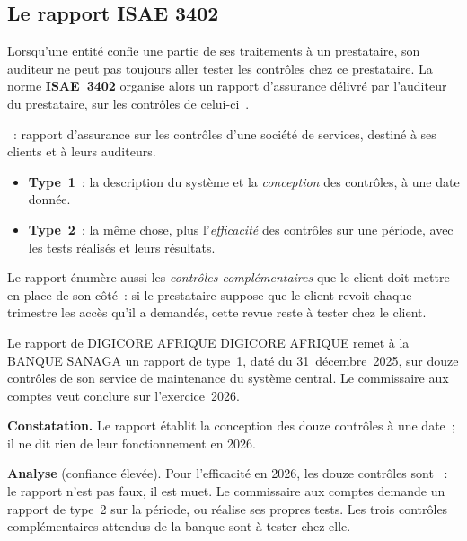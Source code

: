 \subsection{Le rapport ISAE 3402}

Lorsqu'une entité confie une partie de ses traitements à un prestataire,
son auditeur ne peut pas toujours aller tester les contrôles chez ce
prestataire. La norme \textbf{ISAE~3402} organise alors un rapport
d'assurance délivré par l'auditeur du prestataire, sur les contrôles de
celui-ci~\cite{iaasb2011isae3402}.

\begin{boxdef}
~: rapport d'assurance
sur les contrôles d'une société de services, destiné à ses clients et à
leurs auditeurs.
\begin{itemize}
    \item \textbf{Type~1}~: la description du système et la \emph{conception}
          des contrôles, à une date donnée.
    \item \textbf{Type~2}~: la même chose, plus l'\emph{efficacité} des
          contrôles sur une période, avec les tests réalisés et leurs
          résultats.
\end{itemize}
\end{boxdef}

Le rapport énumère aussi les \emph{contrôles complémentaires} que le client
doit mettre en place de son côté~: si le prestataire suppose que le client
revoit chaque trimestre les accès qu'il a demandés, cette revue reste à
tester chez le client.

\begin{boxlecture}{Le rapport de DIGICORE AFRIQUE}
DIGICORE AFRIQUE remet à la BANQUE SANAGA un rapport de type~1, daté du
31~décembre~2025, sur douze contrôles de son service de maintenance du
système central. Le commissaire aux comptes veut conclure sur
l'exercice~2026.

\medskip
\textbf{Constatation.} Le rapport établit la conception des douze contrôles
à une date~; il ne dit rien de leur fonctionnement en 2026.

\medskip
\textbf{Analyse} (confiance élevée). Pour l'efficacité en 2026, les douze
contrôles sont \NEK{}~: le rapport n'est pas faux, il est muet. Le
commissaire aux comptes demande un rapport de type~2 sur la période, ou
réalise ses propres tests. Les trois contrôles complémentaires attendus de
la banque sont à tester chez elle.

\medskip
\hfill{}
\end{boxlecture}


